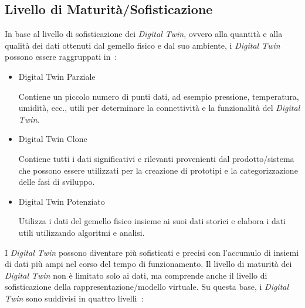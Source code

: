 \subsection{Livello di Maturità/Sofisticazione}

In base al livello di sofisticazione dei \emph{Digital Twin}, ovvero alla quantità e alla qualità dei dati ottenuti dal gemello fisico e dal suo ambiente, i \emph{Digital Twin} possono essere raggruppati in~\cite{DT_tipi}:

\begin{itemize}
    \item Digital Twin Parziale
    
    Contiene un piccolo numero di punti dati, ad esempio pressione, temperatura, umidità, ecc., utili per determinare la connettività e la funzionalità del \emph{Digital Twin}.

    \item Digital Twin Clone
    
    Contiene tutti i dati significativi e rilevanti provenienti dal prodotto/sistema che possono essere utilizzati per la creazione di prototipi e la categorizzazione delle fasi di sviluppo.

    \item Digital Twin Potenziato
    
    Utilizza i dati del gemello fisico insieme ai suoi dati storici e elabora i dati utili utilizzando algoritmi e analisi.
\end{itemize}

\newpage

I \emph{Digital Twin} possono diventare più sofisticati e precisi con l'accumulo di insiemi di dati più ampi nel corso del tempo di funzionamento. Il livello di maturità dei \emph{Digital Twin} non è limitato solo ai dati, ma comprende anche il livello di sofisticazione della rappresentazione/modello virtuale. Su questa base, i \emph{Digital Twin} sono suddivisi in quattro livelli~\cite{Sofisticazione}:

